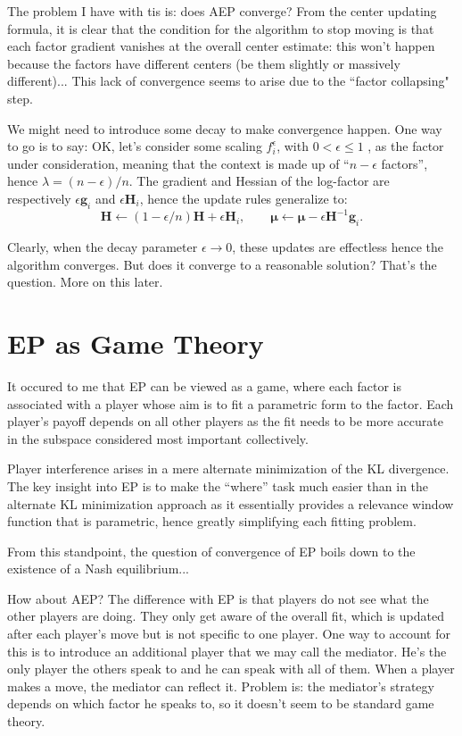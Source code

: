\documentclass{article}
\def\m{{\boldsymbol{\mu}}}
\def\H{\mathbf{H}}
\def\g{\mathbf{g}}
\begin{document}
The problem I have with tis is: does AEP converge? From the center updating formula, it is clear that the condition for the algorithm to stop moving is that each factor gradient vanishes at the overall center estimate: this won't happen because the factors have  different centers (be them slightly or massively different)... This lack of convergence seems to arise due to the ``factor collapsing" step. 

We might need to introduce some decay to make convergence happen. One way to go is to say: OK, let's consider some scaling $f_i^\epsilon$, with $0<\epsilon\leq 1$ , as the factor under consideration, meaning that the context is made up of ``$n-\epsilon$ factors'', hence $\lambda=(n-\epsilon)/n$. The gradient and Hessian of the log-factor are respectively $\epsilon \g_i$ and $\epsilon \H_i$, hence the update rules generalize to:
$$
\H \leftarrow (1-\epsilon/n)\H + \epsilon \H_i,
\qquad
\m \leftarrow \m - \epsilon\H^{-1}\g_i
.
$$

Clearly, when the decay parameter $\epsilon\to 0$, these updates are effectless hence the algorithm converges. But does it converge to a reasonable solution? That's the question. More on this later.


\section{EP as Game Theory}

It occured to me that EP can be viewed as a game, where each factor is associated with a player whose aim is to fit a parametric form to the factor. Each player's payoff depends on all other players as the fit needs to be more accurate in the subspace considered most important collectively.

Player interference arises in a mere alternate minimization of the KL divergence. The key insight into EP is to make the ``where'' task much easier than in the alternate KL minimization approach as it essentially provides a relevance window function that is parametric, hence greatly simplifying each fitting problem.

From this standpoint, the question of convergence of EP boils down to the existence of a Nash equilibrium...

How about AEP? The difference with EP is that players do not see what the other players are doing. They only get aware of the overall fit, which is updated after each player's move but is not specific to one player. One way to account for this is to introduce an additional player that we may call the mediator. He's the only player the others speak to and he can speak with all of them. When a player makes a move, the mediator can reflect it. Problem is: the mediator's strategy depends on which factor he speaks to, so it doesn't seem to be standard game theory.
\end{document}
